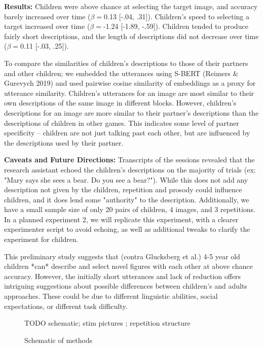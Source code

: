 \documentclass[11pt,a4paper]{article}
\begin{document}
\textbf{Results:} 
Children were above chance at selecting the target image, and accuracy barely increased over time ($\beta=$0.13 [-.04, .31]). Children's speed to selecting a target increased over time ($\beta=$-1.24 [-1.89, -.59]). Children tended to produce fairly short descriptions, and the length of descriptions did not decrease over time ($\beta=$0.11 [-.03, .25]). 

To compare the similarities of children's descriptions to those of their partners and other children; we embedded the utterances using S-BERT (Reimers \& Gurevych 2019) and used pairwise cosine similarity of embeddings as a proxy for utterance similarity. Children's utterances for an image are most similar to their own descriptions of the same image in different blocks. However, children's descriptions for an image are more similar to their partner's descriptions than the descriptions of children in other games. This indicates some level of partner specificity -- children are not just talking past each other, but are influenced by the descriptions used by their partner. 

\textbf{Caveats and Future Directions:} 
Transcripts of the sessions revealed that the research assistant echoed the children's descriptions on the majority of trials (ex: "Mary says she sees a bear. Do you see a bear?"). While this does not add any description not given by the children, repetition and prosody could influence children, and it does lend some "authority" to the description. Additionally, we have a small sample size of only 20 pairs of children, 4 images, and 3 repetitions. In a planned experiment 2, we will replicate this experiment, with a clearer experimenter script to avoid echoing, as well as additional tweaks to clarify the experiment for children. 

This preliminary study suggests that (contra Glucksberg et al.) 4-5 year old children *can* describe and select novel figures with each other at above chance accuracy. However, the initially short utterances and lack of reduction offers intriguing suggestions about possible differences between children's and adults approaches. These could be due to different linguistic abilities, social expectations, or different task difficulty. 
\newpage

\begin{figure}
	\caption{Schematic of methods}
	TODO schematic; stim pictures ; repetition structure 
\end{figure}
\end{document}
